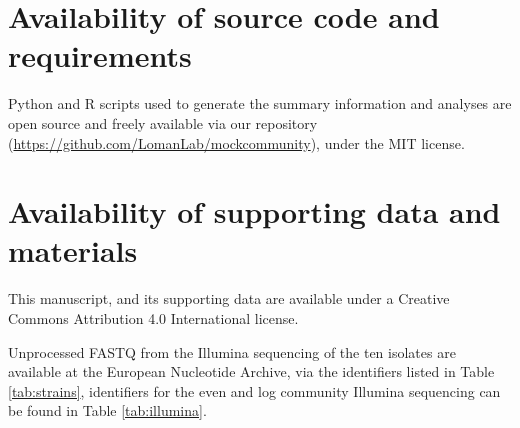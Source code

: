 \documentclass[a4paper,num-refs]{oup-contemporary}
\begin{document}


\section{Availability of source code and requirements}
Python and R scripts used to generate the summary information and analyses are open source and freely available via our repository (\url{https://github.com/LomanLab/mockcommunity}), under the MIT license.



\section{Availability of supporting data and materials}
This manuscript, and its supporting data are available under a Creative Commons Attribution 4.0 International license.

Unprocessed FASTQ from the Illumina sequencing of the ten isolates are available at the European Nucleotide Archive, via the identifiers listed in Table \ref{tab:strains}, identifiers for the even and log community Illumina sequencing can be found in Table \ref{tab:illumina}.
\end{document}
